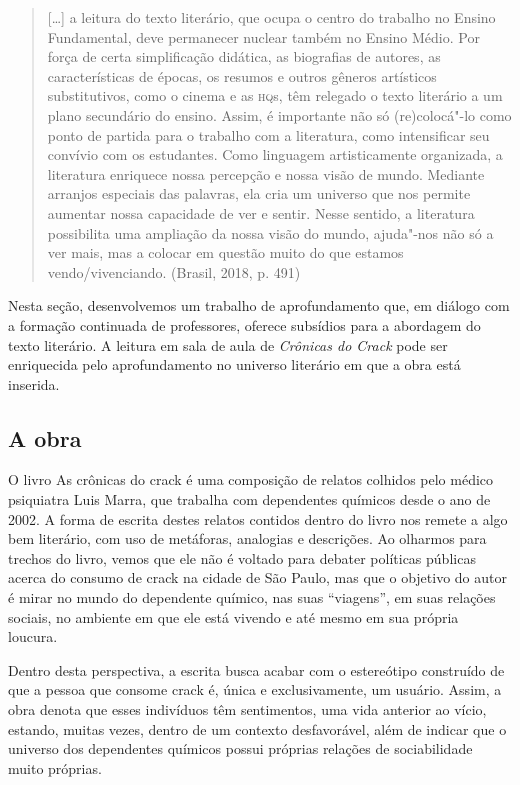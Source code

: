 \documentclass[11pt]{extarticle}
\begin{document}
\begin{quote}
{[}\ldots{]} a leitura do texto literário, que ocupa o centro do trabalho
no Ensino Fundamental, deve permanecer nuclear também no Ensino Médio.
Por força de certa simplificação didática, as biografias de autores, as
características de épocas, os resumos e outros gêneros artísticos
substitutivos, como o cinema e as \textsc{hq}s, têm relegado o texto literário a
um plano secundário do ensino. Assim, é importante não só (re)colocá"-lo
como ponto de partida para o trabalho com a literatura, como
intensificar seu convívio com os estudantes. Como linguagem
artisticamente organizada, a literatura enriquece nossa percepção e
nossa visão de mundo. Mediante arranjos especiais das palavras, ela cria
um universo que nos permite aumentar nossa capacidade de ver e sentir.
Nesse sentido, a literatura possibilita uma ampliação da nossa visão do
mundo, ajuda"-nos não só a ver mais, mas a colocar em questão muito do
que estamos vendo/vivenciando. (Brasil, 2018, p. 491)
\end{quote}

Nesta seção, desenvolvemos um trabalho de aprofundamento que, em diálogo
com a formação continuada de professores, oferece subsídios para a
abordagem do texto literário. A leitura em sala de aula de
\emph{Crônicas do Crack} pode ser enriquecida pelo aprofundamento no
universo literário em que a obra está inserida.

\subsection{A obra}

O livro As crônicas do crack é uma composição de relatos colhidos
pelo médico psiquiatra Luis Marra, que trabalha com dependentes químicos
desde o ano de 2002. A forma de escrita destes relatos contidos dentro
do livro nos remete a algo bem literário, com uso de metáforas,
analogias e descrições. Ao olharmos para trechos do livro, vemos que ele
não é voltado para debater políticas públicas acerca do consumo de crack
na cidade de São Paulo, mas que o objetivo do autor é mirar no mundo do
dependente químico, nas suas ``viagens'', em suas relações sociais, no
ambiente em que ele está vivendo e até mesmo em sua própria loucura.

Dentro desta perspectiva, a escrita busca acabar com o estereótipo
construído de que a pessoa que consome crack é, única e exclusivamente,
um usuário. Assim, a obra denota que esses indivíduos têm sentimentos,
uma vida anterior ao vício, estando, muitas vezes, dentro de um contexto
desfavorável, além de indicar que o universo dos dependentes químicos
possui próprias relações de sociabilidade muito próprias.
\end{document}
